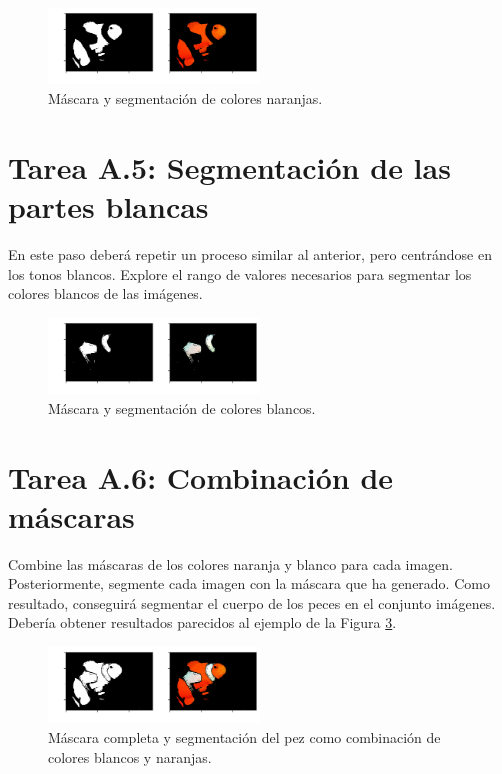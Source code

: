 \begin{figure}[h]
    \centering
    \includegraphics[width=0.5\textwidth]{Lab_2/template/figures/orange.png}
    \caption{Máscara y segmentación de colores naranjas.}
    \label{fig:orange_mask}
\end{figure}

\section*{Tarea A.5: Segmentación de las partes blancas}

En este paso deberá repetir un proceso similar al anterior, pero centrándose en los tonos blancos. Explore el rango de valores necesarios para segmentar los colores blancos de las imágenes.

\begin{figure}[h]
    \centering
    \includegraphics[width=0.5\textwidth]{Lab_2/template/figures/white.png}
    \caption{Máscara y segmentación de colores blancos.}
    \label{fig:whithe_mask}
\end{figure}

\section*{Tarea A.6: Combinación de máscaras}

Combine las máscaras de los colores naranja y blanco para cada imagen. Posteriormente, segmente cada imagen con la máscara que ha generado. Como resultado, conseguirá segmentar el cuerpo de los peces en el conjunto imágenes. Debería obtener resultados parecidos al ejemplo de la Figura \ref{fig:fish_output}.


\begin{figure}[h]
    \centering
    \includegraphics[width=0.5\textwidth]{Lab_2/template/figures/output.png}
    \caption{Máscara completa y segmentación del pez como combinación de colores blancos y naranjas.}
    \label{fig:fish_output}
\end{figure}


